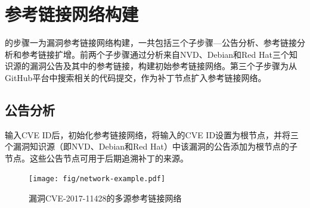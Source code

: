 
\section{参考链接网络构建}
\tool 的步骤一为漏洞参考链接网络构建，一共包括三个子步骤---公告分析、参考链接分析和参考链接扩增。前两个子步骤通过分析来自NVD、Debian和Red Hat三个知识源的漏洞公告及其中的参考链接，构建初始参考链接网络。第三个子步骤为从GitHub平台中搜索相关的代码提交，作为补丁节点扩入参考链接网络。

\subsection{公告分析} \label{sec:advisory analysis}
输入CVE ID后，\tool 初始化参考链接网络，将输入的CVE ID设置为根节点，并将三个漏洞知识源（即NVD、Debian和Red Hat）中该漏洞的公告添加为根节点的子节点。这些公告节点可用于后期追溯补丁的来源。%

\begin{figure}[!t]
    \centering
    \texttt{[image: fig/network-example.pdf]}
    \caption{漏洞CVE-2017-11428的多源参考链接网络}\label{fig:example}
\end{figure}

